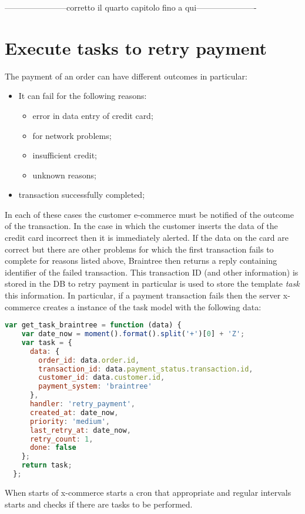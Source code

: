 {\color{red} -----------------------corretto il quarto capitolo fino a qui----------------------}
\section{Execute tasks to retry payment}
\label{sec:tasks_to_retry_payment}
The payment of an order can have different outcomes in particular:
\begin{itemize}
\item It can fail for the following reasons:
\begin{itemize}
\item error in data entry of credit card;
\item for network problems;
\item insufficient credit;
\item unknown reasons;
\end{itemize}
\item transaction successfully completed;
\end{itemize}
In each of these cases the customer e-commerce must be notified of the outcome of the transaction.
\newline
In the case in which the customer inserts the data of the credit card incorrect then it is immediately alerted.
\newline
If the data on the card are correct but there are other problems for which the first transaction fails to complete for reasons listed above, Braintree then returns a reply containing identifier of the failed transaction.
\newline
This transaction ID (and other information) is stored in the DB to retry payment in particular is used to store the template \emph{task} this information.
In particular, if a payment transaction fails then the server x-commerce creates a instance of the task model with the following data:
\begin{lstlisting}[language=javascript]
  var get_task_braintree = function (data) {
    var date_now = moment().format().split('+')[0] + 'Z';
    var task = {
      data: {
        order_id: data.order.id,
        transaction_id: data.payment_status.transaction.id,
        customer_id: data.customer.id,
        payment_system: 'braintree'
      },
      handler: 'retry_payment',
      created_at: date_now,
      priority: 'medium',
      last_retry_at: date_now,
      retry_count: 1,
      done: false
    };
    return task;
  };
\end{lstlisting}
When starts of x-commerce starts a cron that appropriate and regular intervals starts and checks if there are tasks to be performed.
